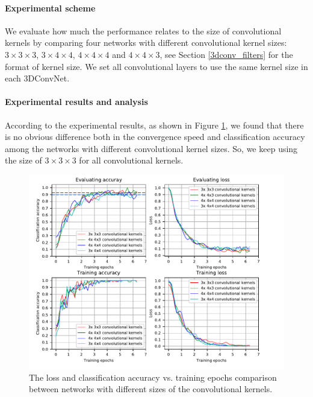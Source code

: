 \paragraph{Experimental scheme}
We evaluate how much the performance relates to the size of convolutional kernels by comparing four networks with different convolutional kernel sizes: \(3 \times 3 \times 3\), \(3\times 4 \times 4\), \(4\times4\times4\) and \(4\times 4 \times 3\), see Section \ref{3dconv_filters} for the format of kernel size. We set all convolutional layers to use the same kernel size in each 3DConvNet. 

\paragraph{Experimental results and analysis}
According to the experimental results, as shown in Figure \ref{fig:plot_cnn_kernel}, we found that there is no obvious difference both in the convergence speed and classification accuracy among the networks with different convolutional kernel sizes. So, we keep using the size of \(3\times 3 \times 3\) for all convolutional kernels.
\begin{figure}
	\includegraphics[trim=0cm 0cm 0cm 0cm]{fig01/plot_cnn_kernel.pdf}
	\caption{The loss and classification accuracy vs. training epochs comparison between networks with different sizes of the convolutional kernels.}
	\label{fig:plot_cnn_kernel}
\end{figure}



